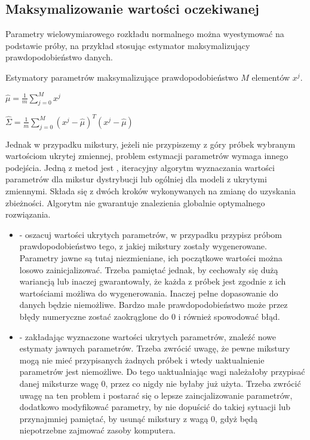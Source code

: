 \subsection{Maksymalizowanie wartości oczekiwanej}\label{sec:expectation_maximization}

Parametry wielowymiarowego rozkładu normalnego można wyestymować na podstawie próby, na przykład
stosując estymator maksymalizujący prawdopodobieństwo danych.

Estymatory parametrów maksymalizujące prawdopodobieństwo $M$ elementów $x^j$.

$\hat{\mu} = \frac{1}{m} \sum_{j=0}^M x^{j}$

$\hat{\Sigma} = \frac{1}{m} \sum_{j=0}^M (x^{j} - \hat{\mu})^T (x^{j} - \hat{\mu})$

Jednak w przypadku mikstury, jeżeli nie przypiszemy z góry próbek wybranym wartościom ukrytej zmiennej, problem
estymacji parametrów wymaga innego podejścia. Jedną z metod jest , iteracyjny
algorytm wyznaczania wartości parametrów dla mikstur dystrybucji lub ogólniej dla modeli z ukrytymi zmiennymi.
Składa się z dwóch kroków wykonywanych na zmianę do uzyskania zbieżności.  Algorytm nie gwarantuje znalezienia
globalnie optymalnego rozwiązania.

\begin{itemize}
    \item {} - oszacuj wartości ukrytych parametrów, w przypadku  przypisz próbom
        prawdopodobieństwo tego, z jakiej mikstury zostały wygenerowane. Parametry jawne są tutaj niezmieniane,
        ich początkowe wartości można losowo zainicjalizować. Trzeba pamiętać jednak, by cechowały się dużą wariancją
        lub inaczej gwarantowały, że każda z próbek jest zgodnie z ich wartościami możliwa do wygenerowania. Inaczej
        pełne dopasowanie do danych będzie niemożliwe. Bardzo małe prawdopodobieństwo może przez błędy numeryczne
        zostać zaokrąglone do $0$ i również spowodować błąd.
    \item {} - zakładając wyznaczone wartości ukrytych parametrów, znaleźć nowe  estymaty
        jawnych parametrów. Trzeba zwrócić uwagę, że pewne mikstury mogą nie mieć przypisanych żadnych próbek
        i wtedy uaktualnienie parametrów jest niemożliwe. Do tego uaktualniając wagi  należałoby
        przypisać danej miksturze wagę $0$, przez co nigdy nie byłaby już użyta. Trzeba zwrócić uwagę na ten problem
        i postarać się o lepsze zaincjalizowanie parametrów, dodatkowo modyfikować parametry, by nie dopuścić
        do takiej sytuacji lub przynajmniej pamiętać, by usunąć mikstury z wagą $0$, gdyż będą niepotrzebne zajmować
        zasoby komputera.
\end{itemize}

